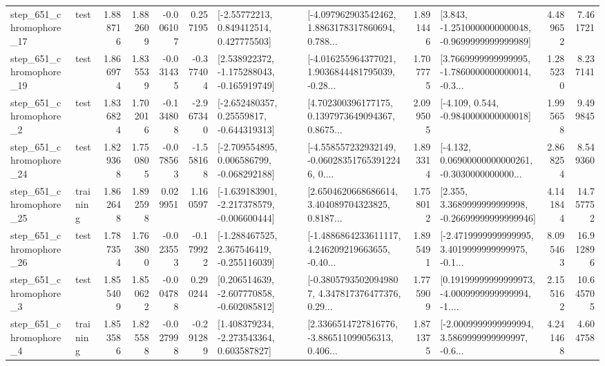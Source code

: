 \begin{tabular}{llrrrrllrlrr}
  step\_651\_chromophore\_17 &      test &      1.888716 &    1.882609 &     -0.006107 &  0.257195 &     [-2.55772213, 0.849412514, 0.427775503] &  [-4.097962903542462, 1.8863178317860694, 0.788... &       1.891446 &  [3.843, -1.2510000000000048, -0.9699999999999989] &            4.489652 &          7.461721 \\
  step\_651\_chromophore\_19 &      test &      1.866974 &    1.835539 &     -0.031435 & -0.377404 &   [2.538922372, -1.175288043, -0.165919749] &  [-4.016255964377021, 1.9036844481795039, -0.28... &       1.707775 &  [3.7669999999999995, -1.7860000000000014, -0.3... &            1.285230 &          8.237141 \\
   step\_651\_chromophore\_2 &      test &      1.836824 &    1.702016 &     -0.134808 & -2.967340 &    [-2.652480357, 0.25559817, -0.644319313] &  [4.702300396177175, 0.1397973649094367, 0.8675... &       2.099505 &               [-4.109, 0.544, -0.9840000000000018] &            1.995658 &          9.499845 \\
  step\_651\_chromophore\_24 &      test &      1.829368 &    1.750805 &     -0.078563 & -1.558168 &   [-2.709554895, 0.006586799, -0.068292188] &  [-4.558557232932149, -0.060283517653912246, 0.... &       1.893314 &  [-4.132, 0.06900000000000261, -0.3030000000000... &            2.868254 &          8.549360 \\
  step\_651\_chromophore\_25 &  training &      1.862648 &    1.892598 &      0.029951 &  1.160597 &  [-1.639183901, -2.217378579, -0.006600444] &  [2.6504620668686614, 3.404089704323825, 0.8187... &       1.758012 &  [2.355, 3.3689999999999998, -0.26699999999999946] &            4.141844 &         14.757752 \\
  step\_651\_chromophore\_26 &      test &      1.787354 &    1.763800 &     -0.023553 & -0.179922 &   [-1.288467525, 2.367546419, -0.255116039] &  [-1.4886864233611117, 4.246209219663655, -0.40... &       1.895491 &  [-2.4719999999999995, 3.4019999999999975, -0.1... &            8.095463 &         16.912896 \\
   step\_651\_chromophore\_3 &      test &      1.855409 &    1.850622 &     -0.004788 &  0.290244 &   [0.206514639, -2.607770858, -0.602085812] &  [-0.38057935020949807, 4.347817376477376, 0.29... &       1.775909 &  [0.19199999999999973, -4.0009999999999994, -1.... &            2.155162 &         10.645705 \\
   step\_651\_chromophore\_4 &  training &      1.853586 &    1.825588 &     -0.027998 & -0.291289 &    [1.408379234, -2.273543364, 0.603587827] &  [2.3366514727816776, -3.886511099056313, 0.406... &       1.871375 &  [-2.0009999999999994, 3.5869999999999997, -0.6... &            4.241468 &          4.604758 \\

\end{tabular}
